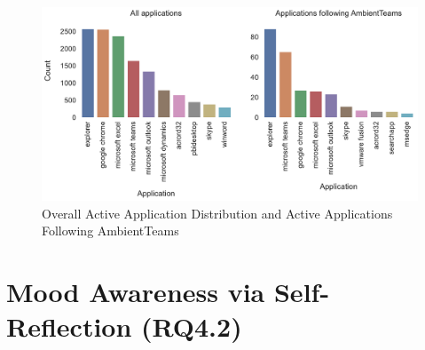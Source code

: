 \begin{figure}[h]
    \centering
    \includegraphics[width=.7\linewidth]{plots/active_windows.pdf}
    \caption{Overall Active Application Distribution and Active Applications Following AmbientTeams}
    \label{fig:active_windows}
\end{figure}









\section{Mood Awareness via Self-Reflection (RQ4.2)}
\label{section:mood_awareness_via_selfreflection}

